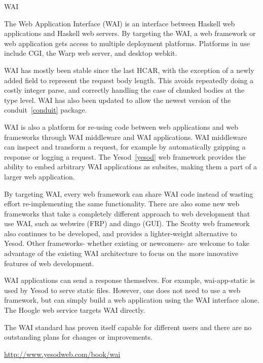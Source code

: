 \begin{hcarentry}{WAI}
\label{wai}
\makeheader

The Web Application Interface (WAI) is an interface between Haskell web
applications and Haskell web servers. By targeting the WAI, a web framework or web application gets access to multiple deployment platforms. Platforms in use include CGI, the Warp web server, and desktop webkit.

WAI has mostly been stable since the last HCAR, with the exception of a newly added field to represent the request body length. This avoids repeatedly doing a costly integer parse, and correctly handling the case of chunked bodies at the type level. WAI has also been updated to allow the newest version of the conduit~\cref{conduit} package.

WAI is also a platform for re-using code between web applications and web frameworks through WAI middleware and WAI applications. WAI middleware can inspect and transform a request, for example by automatically gzipping a response or logging a request. The Yesod~\cref{yesod} web framework provides the ability to embed arbitrary WAI applications as subsites, making them a part of a larger web application.

By targeting WAI, every web framework can share WAI code instead of wasting effort re-implementing the same functionality. There are also some new web frameworks that take a completely different approach to web development that use WAI, such as webwire (FRP) and dingo (GUI). The Scotty web framework also continues to be developed, and provides a lighter-weight alternative to Yesod. Other frameworks- whether existing or newcomers- are welcome to take advantage of the existing WAI architecture to focus on the more innovative features of web development.

WAI applications can send a response themselves. For example, wai-app-static is used by Yesod to serve static files. However, one does not need to use a web framework, but can simply build a web application using the WAI interface alone. The Hoogle %
web service targets WAI directly.

The WAI standard has proven itself capable for different users and there are no outstanding plans for changes or improvements.

\FurtherReading
\url{http://www.yesodweb.com/book/wai}
\end{hcarentry}
